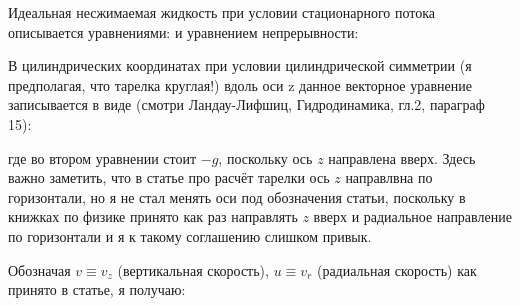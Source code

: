 \documentclass{article}
\def\vec#1{\mbox{\boldmath$#1$}}
\begin{document}
Идеальная несжимаемая жидкость при условии стационарного потока описывается уравнениями:
\eqn{
(\vec{v}\cdot\vec{\nabla})\vec{v} = \vec{\nabla}\frac{p}{\rho} + \vec{g}
}
и уравнением непрерывности:
\eqn{
\vec{\nabla} \vec{v} = 0.
}

\p
В цилиндрических координатах при условии цилиндрической симметрии (я предполагая, что тарелка круглая!) вдоль оси z данное векторное уравнение записывается в виде (смотри Ландау-Лифшиц, Гидродинамика, гл.2, параграф 15):

\p


где во втором уравнении стоит $-g$, поскольку ось $z$ направлена вверх. Здесь важно заметить, что в статье про расчёт тарелки ось $z$ направлвна по горизонтали, но я не стал менять оси под обозначения статьи, поскольку в книжках по физике принято как раз направлять $z$ вверх и радиальное направление по горизонтали и я к такому соглашению слишком привык.

\p
Обозначая $v \equiv v_z$ (вертикальная скорость), $u \equiv v_r$ (радиальная скорость) как принято в статье, я получаю:


\p
\end{document}
